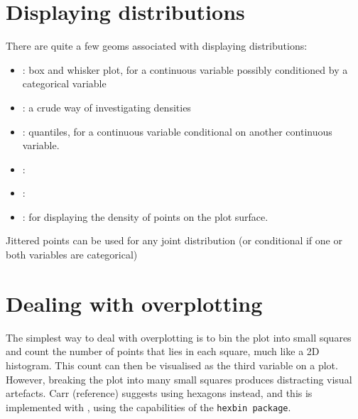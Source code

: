 \section{Displaying distributions}\label{sec:distributions}

There are quite a few geoms associated with displaying distributions:

\begin{itemize}
	\item {}: box and whisker plot, for a continuous variable possibly conditioned by a categorical variable
	\item {}: a crude way of investigating densities
	\item {}: quantiles, for a continuous variable conditional on another continuous variable.
	\item {}: 
	\item {}: 
	\item {}: for displaying the density of points on the plot surface.
\end{itemize}

% 
% 
%   
% 
% 

Jittered points can be used for any joint distribution (or conditional if one or both variables are categorical)

\section{Dealing with overplotting}
\label{sec:overplotting}

The simplest way to deal with overplotting is to bin the plot into small squares and count the number of points that lies in each square, much like a 2D histogram.  This count can then be visualised as the third variable on a plot.  However, breaking the plot into many small squares produces distracting visual artefacts.  Carr (reference) suggests using hexagons instead, and this is implemented with , using the capabilities of the {\tt hexbin package}.

